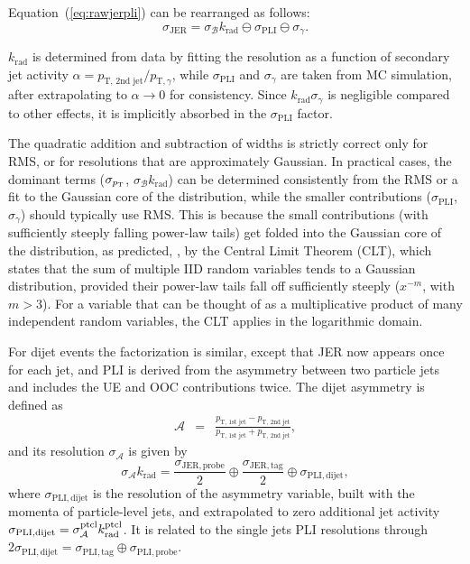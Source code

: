 \documentclass[11pt,twoside,a4paper,cmspaper,final,collab]{cms-tdr}
\begin{document}
Equation~(\ref{eq:rawjerpli}) can be rearranged as follows:
\begin{equation}
\sigma_\mathrm{JER} = \sigma_{\mathcal{B}} k_\text{rad}\ominus \sigma_\mathrm{PLI} \ominus \sigma_\gamma.
\end{equation}

$k_\text{rad}$ is determined from data by fitting the resolution as a function of secondary jet activity $\alpha=p_\text{T, 2nd jet}/p_{\mathrm{T,}\gamma}$, while $\sigma_\mathrm{ PLI}$ and $\sigma_\gamma$ are taken from MC simulation, after extrapolating to $\alpha\to 0$ for consistency. Since $k_\text{rad} \sigma_\gamma$ is negligible compared to other effects, it is
implicitly absorbed in the $\sigma_\mathrm{PLI}$ factor.

The quadratic addition and subtraction of widths is strictly correct only for RMS, or for resolutions that are approximately Gaussian. In practical cases, the dominant terms ($\sigma_{p_{\mathrm{T}}}$, $\sigma_{\mathcal{B}} k_\text{rad}$) can be determined consistently from the RMS or a fit to the Gaussian core of the distribution, while the smaller contributions ($\sigma_\mathrm{PLI}$, $\sigma_\gamma$) should typically use RMS. This is because the small contributions (with sufficiently steeply falling power-law tails) get folded into the Gaussian core of the distribution, as predicted, \eg, by the Central Limit Theorem (CLT), which states that the sum of multiple IID random variables tends to a Gaussian distribution, provided their power-law tails fall off sufficiently steeply ($x^{-m}$, with $m>3$). For a variable that can be thought of as a multiplicative product of many independent random variables, the CLT applies in the logarithmic domain.

For dijet events the factorization is similar, except that JER now appears once for each jet, and PLI is derived from the asymmetry between two particle jets and includes the UE and OOC contributions twice. The dijet asymmetry \cite{JEC_JINST} is defined as
\begin{eqnarray}
\mathcal{A} &=& \frac{p_\text{T, 1st jet}-p_\text{T, 2nd jet}}{p_\text{T, 1st jet}+p_\text{T, 2nd jet}}\label{eq:dijetasym_def},
\end{eqnarray}
and its resolution $\sigma_{\mathcal{A}}$ is given by
\begin{equation}
  \sigma_{\mathcal{A}} k_\text{rad}=
\frac{\sigma_\mathrm{JER,probe}}{2}
\oplus\frac{\sigma_\mathrm{JER,tag}}{2}
\oplus \sigma_\mathrm{PLI,dijet} , \label{eq:dijet_reso}
\end{equation}
where $\sigma_\mathrm{PLI,dijet}$ is the resolution of the asymmetry variable, built with the momenta of particle-level jets, and extrapolated to zero additional jet activity $\sigma_\mathrm{PLI,dijet}=\sigma_{\mathcal{A}}^{ \rm ptcl} k_\text{rad}^\mathrm{ptcl}$. It is related to the single jets PLI resolutions through $2\sigma_\mathrm{ PLI,dijet}=\sigma_\mathrm{PLI,tag} \oplus \sigma_\mathrm{PLI,probe}$.
\end{document}

